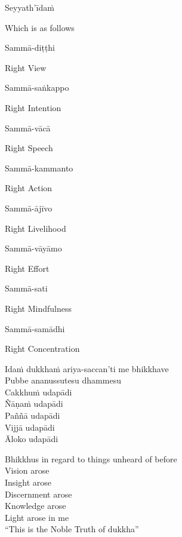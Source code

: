Seyyath'īdaṁ

\begin{english}
  Which is as follows
\end{english}

Sammā-diṭṭhi

\begin{english}
  Right View
\end{english}

Sammā-saṅkappo

\begin{english}
  Right Intention
\end{english}

Sammā-vācā

\begin{english}
  Right Speech
\end{english}

Sammā-kammanto

\begin{english}
  Right Action
\end{english}

Sammā-ājīvo

\begin{english}
  Right Livelihood
\end{english}

Sammā-vāyāmo

\begin{english}
  Right Effort
\end{english}

Sammā-sati

\begin{english}
  Right Mindfulness
\end{english}

Sammā-samādhi

\begin{english}
  Right Concentration
\end{english}

Idaṁ dukkhaṁ ariya-saccan'ti me bhikkhave\\
Pubbe ananussutesu dhammesu\\
Cakkhuṁ udapādi\\
Ñāṇaṁ udapādi\\
Paññā udapādi\\
Vijjā udapādi\\
Āloko udapādi

\begin{english-verses}
  Bhikkhus in regard to things unheard of before\\
  Vision arose\\
  Insight arose\\
  Discernment arose\\
  Knowledge arose\\
  Light arose in me\makeatletter\hyperlink{endnote55-appendix}\makeatother\\
  ``This is the Noble Truth of dukkha''
\end{english-verses}

